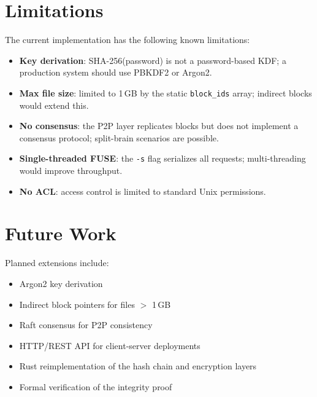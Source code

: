 \documentclass[10pt,twocolumn]{article}
\begin{document}
\begin{center}
\section{Limitations}

The current implementation has the
following known limitations:

\begin{itemize}[leftmargin=*]
    \item \textbf{Key derivation}:
    SHA-256(password) is not a
    password-based KDF; a production
    system should use PBKDF2 or Argon2.

    \item \textbf{Max file size}:
    limited to 1\,GB by the static
    \texttt{block\_ids} array;
    indirect blocks would extend this.

    \item \textbf{No consensus}:
    the P2P layer replicates blocks
    but does not implement a consensus
    protocol; split-brain scenarios
    are possible.

    \item \textbf{Single-threaded FUSE}:
    the \texttt{-s} flag serializes
    all requests; multi-threading
    would improve throughput.

    \item \textbf{No ACL}:
    access control is limited to
    standard Unix permissions.
\end{itemize}

\section{Future Work}

Planned extensions include:

\begin{itemize}[leftmargin=*]
    \item Argon2 key derivation
    \item Indirect block pointers
    for files $>$ 1\,GB
    \item Raft consensus for
    P2P consistency
    \item HTTP/REST API for
    client-server deployments
    \item Rust reimplementation
    of the hash chain and
    encryption layers
    \item Formal verification of
    the integrity proof
\end{itemize}


\end{center}
\end{document}
